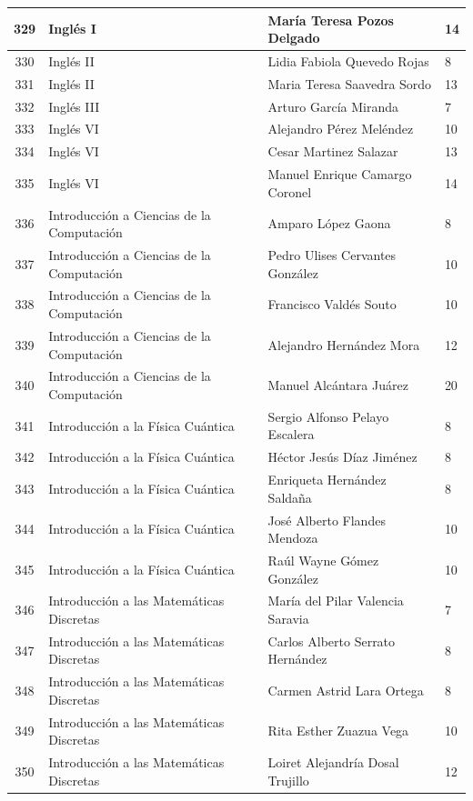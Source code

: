 {\begin{longtable}{|c|p{6.5cm}|p{5cm}|p{1.5cm}|}
  329 & Inglés I & María Teresa Pozos Delgado & 14 \\ \hline
  330 & Inglés II & Lidia Fabiola Quevedo Rojas & 8 \\ \hline
  331 & Inglés II & Maria Teresa Saavedra Sordo & 13 \\ \hline
  332 & Inglés III & Arturo García Miranda & 7 \\ \hline
  333 & Inglés VI & Alejandro Pérez Meléndez & 10 \\ \hline
  334 & Inglés VI & Cesar Martinez Salazar & 13 \\ \hline
  335 & Inglés VI & Manuel Enrique Camargo Coronel & 14 \\ \hline
  336 & Introducción a Ciencias de la Computación & Amparo López Gaona & 8 \\ \hline
  337 & Introducción a Ciencias de la Computación & Pedro Ulises Cervantes González & 10 \\ \hline
  338 & Introducción a Ciencias de la Computación & Francisco Valdés Souto & 10 \\ \hline
  339 & Introducción a Ciencias de la Computación & Alejandro Hernández Mora & 12 \\ \hline
  340 & Introducción a Ciencias de la Computación & Manuel Alcántara Juárez & 20 \\ \hline
  341 & Introducción a la Física Cuántica & Sergio Alfonso Pelayo Escalera & 8 \\ \hline
  342 & Introducción a la Física Cuántica & Héctor Jesús Díaz Jiménez & 8 \\ \hline
  343 & Introducción a la Física Cuántica & Enriqueta Hernández Saldaña & 8 \\ \hline
  344 & Introducción a la Física Cuántica & José Alberto Flandes Mendoza & 10 \\ \hline
  345 & Introducción a la Física Cuántica & Raúl Wayne Gómez González & 10 \\ \hline
  346 & Introducción a las Matemáticas Discretas & María del Pilar Valencia Saravia & 7 \\ \hline
  347 & Introducción a las Matemáticas Discretas & Carlos Alberto Serrato Hernández & 8 \\ \hline
  348 & Introducción a las Matemáticas Discretas & Carmen Astrid Lara Ortega & 8 \\ \hline
  349 & Introducción a las Matemáticas Discretas & Rita Esther Zuazua Vega & 10 \\ \hline
  350 & Introducción a las Matemáticas Discretas & Loiret Alejandría Dosal Trujillo & 12 \\ \hline

\end{longtable}}
